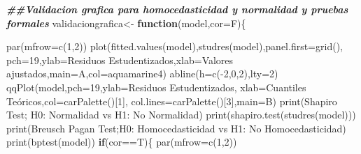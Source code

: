 \documentclass[
]{article}
\newenvironment{Shaded}{\begin{snugshade}}{\end{snugshade}}
\newcommand{\AttributeTok}[1]{\textcolor[rgb]{0.77,0.63,0.00}{#1}}
\newcommand{\ControlFlowTok}[1]{\textcolor[rgb]{0.13,0.29,0.53}{\textbf{#1}}}
\newcommand{\DecValTok}[1]{\textcolor[rgb]{0.00,0.00,0.81}{#1}}
\newcommand{\DocumentationTok}[1]{\textcolor[rgb]{0.56,0.35,0.01}{\textbf{\textit{#1}}}}
\newcommand{\FunctionTok}[1]{\textcolor[rgb]{0.00,0.00,0.00}{#1}}
\newcommand{\NormalTok}[1]{#1}
\newcommand{\OtherTok}[1]{\textcolor[rgb]{0.56,0.35,0.01}{#1}}
\newcommand{\SpecialCharTok}[1]{\textcolor[rgb]{0.00,0.00,0.00}{#1}}
\newcommand{\StringTok}[1]{\textcolor[rgb]{0.31,0.60,0.02}{#1}}
\begin{document}
\begin{Shaded}
\begin{Highlighting}[]
\DocumentationTok{\#\#Validacion grafica para homocedasticidad y normalidad y pruebas formales}
\NormalTok{validaciongrafica}\OtherTok{\textless{}{-}} \ControlFlowTok{function}\NormalTok{(model,}\AttributeTok{cor=}\NormalTok{F)\{}
  
  \FunctionTok{par}\NormalTok{(}\AttributeTok{mfrow=}\FunctionTok{c}\NormalTok{(}\DecValTok{1}\NormalTok{,}\DecValTok{2}\NormalTok{))}
  \FunctionTok{plot}\NormalTok{(}\FunctionTok{fitted.values}\NormalTok{(model),}\FunctionTok{studres}\NormalTok{(model),}\AttributeTok{panel.first=}\FunctionTok{grid}\NormalTok{(),}
       \AttributeTok{pch=}\DecValTok{19}\NormalTok{,}\AttributeTok{ylab=}\StringTok{\textquotesingle{}Residuos Estudentizados\textquotesingle{}}\NormalTok{,}\AttributeTok{xlab=}\StringTok{\textquotesingle{}Valores ajustados\textquotesingle{}}\NormalTok{,}\AttributeTok{main=}\StringTok{\textquotesingle{}A\textquotesingle{}}\NormalTok{,}\AttributeTok{col=}\StringTok{\textquotesingle{}aquamarine4\textquotesingle{}}\NormalTok{)}
  \FunctionTok{abline}\NormalTok{(}\AttributeTok{h=}\FunctionTok{c}\NormalTok{(}\SpecialCharTok{{-}}\DecValTok{2}\NormalTok{,}\DecValTok{0}\NormalTok{,}\DecValTok{2}\NormalTok{),}\AttributeTok{lty=}\DecValTok{2}\NormalTok{)}
  \FunctionTok{qqPlot}\NormalTok{(model,}\AttributeTok{pch=}\DecValTok{19}\NormalTok{,}\AttributeTok{ylab=}\StringTok{\textquotesingle{}Residuos Estudentizados\textquotesingle{}}\NormalTok{,}
         \AttributeTok{xlab=}\StringTok{\textquotesingle{}Cuantiles Teóricos\textquotesingle{}}\NormalTok{,}\AttributeTok{col=}\FunctionTok{carPalette}\NormalTok{()[}\DecValTok{1}\NormalTok{],}
         \AttributeTok{col.lines=}\FunctionTok{carPalette}\NormalTok{()[}\DecValTok{3}\NormalTok{],}\AttributeTok{main=}\StringTok{\textquotesingle{}B\textquotesingle{}}\NormalTok{)}
  \FunctionTok{print}\NormalTok{(}\StringTok{\textquotesingle{}Shapiro Test; H0: Normalidad vs H1: No Normalidad\textquotesingle{}}\NormalTok{)}
  \FunctionTok{print}\NormalTok{(}\FunctionTok{shapiro.test}\NormalTok{(}\FunctionTok{studres}\NormalTok{(model)))}
  \FunctionTok{print}\NormalTok{(}\StringTok{\textquotesingle{}Breusch Pagan Test;H0: Homocedasticidad vs H1: No Homocedasticidad\textquotesingle{}}\NormalTok{)}
  \FunctionTok{print}\NormalTok{(}\FunctionTok{bptest}\NormalTok{(model))}
  \ControlFlowTok{if}\NormalTok{(cor}\SpecialCharTok{==}\NormalTok{T)\{}
    \FunctionTok{par}\NormalTok{(}\AttributeTok{mfrow=}\FunctionTok{c}\NormalTok{(}\DecValTok{1}\NormalTok{,}\DecValTok{2}\NormalTok{))}

\end{Highlighting}
\end{Shaded}
\end{document}
